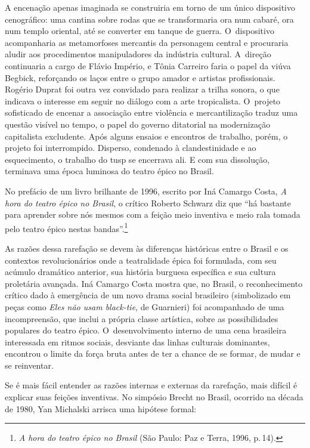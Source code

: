 A encenação apenas imaginada se construiria em torno de um único
dispositivo cenográfico: uma cantina sobre rodas que se transformaria
ora num cabaré, ora num templo oriental, até se converter em tanque de
guerra. O~dispositivo acompanharia as metamorfoses mercantis da
personagem central e procuraria aludir aos procedimentos manipuladores
da indústria cultural. A~direção continuaria a cargo de Flávio Império,
e Tônia Carreiro faria o papel da viúva Begbick, reforçando os laços
entre o grupo amador e artistas profissionais. Rogério Duprat foi outra
vez convidado para realizar a trilha sonora, o que indicava o interesse
em seguir no diálogo com a arte tropicalista. O~projeto
sofisticado de encenar a associação entre violência e mercantilização
traduz uma questão visível no tempo, o papel do governo ditatorial na
modernização capitalista excludente. Após alguns ensaios e encontros de
trabalho, porém, o projeto foi interrompido. Disperso, condenado à
clandestinidade e ao esquecimento, o trabalho do {\sc tusp} se encerrava ali.
E com sua dissolução, terminava uma época luminosa do teatro épico no
Brasil.

No prefácio de um livro brilhante de 1996, escrito por Iná Camargo
Costa, {\it A hora do teatro épico no Brasil}, o crítico Roberto Schwarz
diz que “há bastante para aprender sobre nós mesmos com a feição meio
inventiva e meio rala tomada pelo teatro épico nestas
bandas”.\footnote{{\it A hora do teatro épico no Brasil} (São Paulo: Paz
  e Terra, 1996, p.\,14).}

As razões dessa rarefação se devem às diferenças históricas entre o
Brasil e os contextos revolucionários onde a teatralidade épica foi
formulada, com seu acúmulo dramático anterior, sua história burguesa
específica e sua cultura proletária avançada. Iná Camargo Costa mostra
que, no Brasil, o reconhecimento crítico dado à emergência de um novo
drama social brasileiro (simbolizado em peças como {\it Eles não usam
black-tie}, de Guarnieri) foi acompanhado de uma incompreensão, que
inclui a própria classe artística, sobre as possibilidades populares do
teatro épico. O~desenvolvimento interno de uma cena brasileira
interessada em ritmos sociais, desviante das linhas culturais
dominantes, encontrou o limite da força bruta antes de ter a chance de
se formar, de mudar e se reinventar.

Se é mais fácil entender as razões internas e externas da rarefação,
mais difícil é explicar suas feições inventivas. No simpósio Brecht no Brasil, ocorrido na década de 1980, Yan Michalski arrisca uma hipótese
formal:

